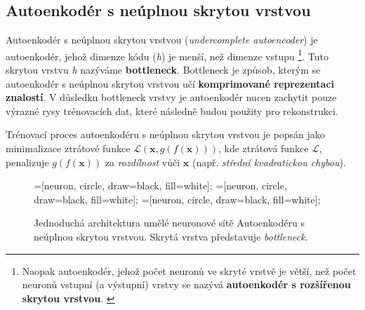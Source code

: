 \subsection{Autoenkodér s neúplnou skrytou vrstvou}
\label{sec:undercomplete_autoencoder}
Autoenkodér s neúplnou skrytou vrstvou (\emph{undercomplete autoencoder}) je autoenkodér, jehož dimenze kódu (\emph{h}) je menší, než dimenze vstupu
\footnote{Naopak autoenkodér, jehož počet neuronů ve skryté vrstvě je větší, než počet neuronů vstupní (a výstupní) vrstvy se nazývá \textbf{autoenkodér s rozšířenou skrytou vrstvou}. \cite{Charte2018}}.
Tuto skrytou vrstvu \emph{h} nazýváme \textbf{bottleneck}. Bottleneck je způsob, kterým se autoenkodér s neúplnou skrytou vrstvou učí \textbf{komprimované reprezentaci znalostí}. 
V důsledku bottleneck vrstvy je autoenkodér nucen zachytit pouze výrazné rysy trénovacích dat, které následně budou použity pro rekonstrukci. \cite{Goodfellow2016}

Trénovací proces autoenkodéru s neúplnou skrytou vrstvou je popsán jako minimalizace ztrátové funkce $\mathcal{L}(\mathbf{x}, g(f(\mathbf{x})))$,
kde ztrátová funkce $\mathcal{L}$, penalizuje $g(f(\mathbf{x}))$ za \emph{rozdílnost} vůči $\mathbf{x}$ (např. \emph{střední kvadratickou chybou}). \cite{Charte2018}

\begin{figure}[H]
    \centering
    \begin{neuralnetwork}[height=4]
        =[neuron, circle, draw=black, fill=white];
        =[neuron, circle, draw=black, fill=white];
        =[neuron, circle, draw=black, fill=white];
      
      
      
        \hiddenlayer[count=2, bias=false, title=Kód $\emph{h}$]
        \linklayers
      
        \outputlayer[count=4, title=Dekodér, text=\xout]
        \linklayers
      
      \end{neuralnetwork}
    \caption{Jednoduchá architektura umělé neuronové sítě Autoenkodéru s neúplnou skrytou vrstvou. Skrytá vrstva představuje \emph{bottleneck}.}
    \label{fig:autoencoder_bottleneck}
\end{figure}